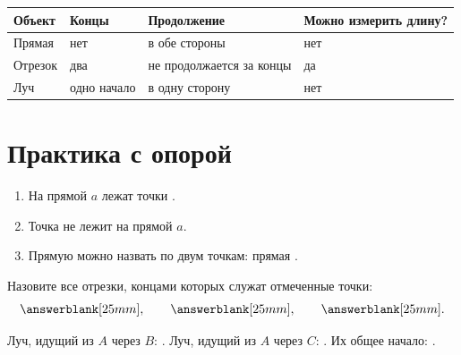 \begin{center}
  \renewcommand{\arraystretch}{1.35}
  \begin{tabularx}{\textwidth}{>{\raggedright\arraybackslash}p{}
    >{\centering\arraybackslash}p{}
    >{\raggedright\arraybackslash}p{}
    >{\centering\arraybackslash}X}
    \toprule
    \rowcolor{TableHeader}
    Объект & Концы & Продолжение & Можно измерить длину? \\
    \midrule
    Прямая & нет & в обе стороны & нет \\
    Отрезок & два & не продолжается за концы & да \\
    Луч & одно начало & в одну сторону & нет \\
    \bottomrule
  \end{tabularx}
\end{center}

\section{Практика с опорой}

\incidenceexamplefigure

\begin{practicebox}
  \begin{enumerate}[label=\alph*)]
    \item На прямой $a$ лежат точки \answerblank[32mm].
    \item Точка \answerblank[15mm] не лежит на прямой $a$.
    \item Прямую можно назвать по двум точкам: прямая \answerblank[22mm].
  \end{enumerate}
\end{practicebox}

\threelinepointsfigure

\begin{practicebox}
  Назовите все отрезки, концами которых служат отмеченные точки:
  \[
    \answerblank[25mm],\qquad \answerblank[25mm],\qquad
    \answerblank[25mm].
  \]
\end{practicebox}

\oppositeraysfigure

\begin{practicebox}
  Луч, идущий из $A$ через $B$: \answerblank[24mm].
  Луч, идущий из $A$ через $C$: \answerblank[24mm].
  Их общее начало: \answerblank[20mm].
\end{practicebox}

